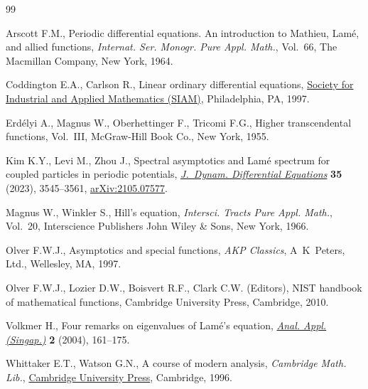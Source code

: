 \documentclass[pdftex]{sigma}
\numberwithin{equation}{section}
\begin{document}
\begin{thebibliography}{99}
\footnotesize\itemsep=0pt

Arscott F.M., Periodic differential equations. {A}n introduction to {M}athieu,
 {L}am\'{e}, and allied functions, \textit{Internat. Ser. Monogr. Pure Appl.
 Math.}, Vol.~66, The Macmillan Company, New York, 1964.

Coddington E.A., Carlson R., Linear ordinary differential equations, \href{https://doi.org/10.1137/1.9781611971439}{Society
 for Industrial and Applied Mathematics (SIAM)}, Philadelphia, PA, 1997.

Erd\'elyi A., Magnus W., Oberhettinger F., Tricomi F.G., Higher transcendental
 functions, {V}ol.~{III}, McGraw-Hill Book Co., New York, 1955.

Kim K.Y., Levi M., Zhou J., Spectral asymptotics and {L}am\'{e} spectrum for
 coupled particles in periodic potentials, \href{https://doi.org/10.1007/s10884-021-10108-z}{\textit{J.~Dynam. Differential
 Equations}} \textbf{35} (2023), 3545--3561, \href{https://arxiv.org/abs/2105.07577}{arXiv:2105.07577}.

Magnus W., Winkler S., Hill's equation, \textit{Intersci. Tracts Pure Appl.
 Math.}, Vol.~20, Interscience Publishers John Wiley \& Sons, New York, 1966.

Olver F.W.J., Asymptotics and special functions, \textit{AKP Classics}, A~K~Peters,
 Ltd., Wellesley, MA, 1997.

Olver F.W.J., Lozier D.W., Boisvert R.F., Clark C.W. (Editors), N{IST} handbook
 of mathematical functions, Cambridge University Press, Cambridge, 2010.

Volkmer H., Four remarks on eigenvalues of {L}am\'e's equation, \href{https://doi.org/10.1142/S0219530504000023}{\textit{Anal.
 Appl. (Singap.)}} \textbf{2} (2004), 161--175.

Whittaker E.T., Watson G.N., A course of modern analysis, \textit{Cambridge Math. Lib.},
 \href{https://doi.org/10.1017/CBO9780511608759}{Cambridge University Press}, Cambridge, 1996.

\end{thebibliography}\LastPageEnding
\end{document}

